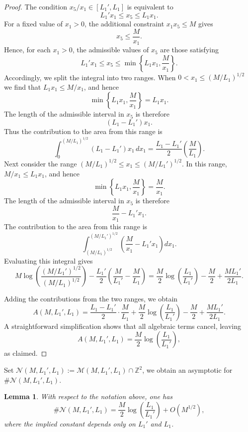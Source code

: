 \documentclass[table]{amsart}
\newtheorem{lemma}[theorem]{Lemma}
\newcommand{\Z}{\mathbb{Z}}
\numberwithin{equation}{section}
\begin{document}
\begin{proof}
The condition $x_5/x_1\in[L_1',L_1]$ is equivalent to
\[
L_1' x_1 \le x_5 \le L_1 x_1.
\]
For a fixed value of $x_1>0$, the additional constraint $x_1x_5\le M$ gives
\[
x_5\le \frac{M}{x_1}.
\]
Hence, for each $x_1>0$, the admissible values of $x_5$ are those satisfying
\[
L_1' x_1 \le x_5 \le \min\!\left\{L_1 x_1,\frac{M}{x_1}\right\}.
\]
Accordingly, we split the integral into two ranges. When $0<x_1\le (M/L_1)^{1/2}$ we find that $L_1x_1\le M/x_1$, and hence
\[
\min\!\left\{L_1 x_1,\frac{M}{x_1}\right\}=L_1x_1.
\]
The length of the admissible interval in $x_5$ is therefore
\[
(L_1-L_1')x_1.
\]
Thus the contribution to the area from this range is
\[
\int_0^{(M/L_1)^{1/2}} (L_1-L_1')x_1\,dx_1
=
\frac{L_1-L_1'}{2}\left(\frac{M}{L_1}\right).
\]
\noindent Next consider the range $(M/L_1)^{1/2}\le x_1\le (M/L_1')^{1/2}$. In this range, $M/x_1\le L_1x_1$, and hence
\[
\min\!\left\{L_1 x_1,\frac{M}{x_1}\right\}=\frac{M}{x_1}.
\]
The length of the admissible interval in $x_5$ is therefore
\[
\frac{M}{x_1}-L_1'x_1.
\]
The contribution to the area from this range is
\[
\int_{(M/L_1)^{1/2}}^{(M/L_1')^{1/2}}
\left(\frac{M}{x_1}-L_1'x_1\right)dx_1.
\]
Evaluating this integral gives
\[
M\log\!\left(\frac{(M/L_1')^{1/2}}{(M/L_1)^{1/2}}\right)
-
\frac{L_1'}{2}
\left(
\frac{M}{L_1'}-\frac{M}{L_1}
\right)
=
\frac{M}{2}\log\!\left(\frac{L_1}{L_1'}\right)
-
\frac{M}{2}
+
\frac{M L_1'}{2L_1}.
\]

\smallskip
\noindent
Adding the contributions from the two ranges, we obtain
\[
A(M,L_1',L_1)
=
\frac{L_1-L_1'}{2}\cdot\frac{M}{L_1}
+
\frac{M}{2}\log\!\left(\frac{L_1}{L_1'}\right)
-
\frac{M}{2}
+
\frac{M L_1'}{2L_1}.
\]
A straightforward simplification shows that all algebraic terms cancel, leaving
\[
A(M,L_1',L_1)
=
\frac{M}{2}\log\!\left(\frac{L_1}{L_1'}\right),
\]
as claimed.
\end{proof}
Set $\mathcal{N}(M, L_1', L_1):=\mathcal{M}(M, L_1', L_1)\cap \Z^2$, we obtain an asymptotic for $\# \mathcal{N}(M, L_1', L_1)$. 

\begin{lemma}
With respect to the notation above, one has
\[
\#\mathcal{N}(M,L_1',L_1)
=
\frac{M}{2}\log\!\left(\frac{L_1}{L_1'}\right)
+
O\!\left(M^{1/2}\right),
\]
where the implied constant depends only on $L_1'$ and $L_1$.
\end{lemma}
\end{document}
